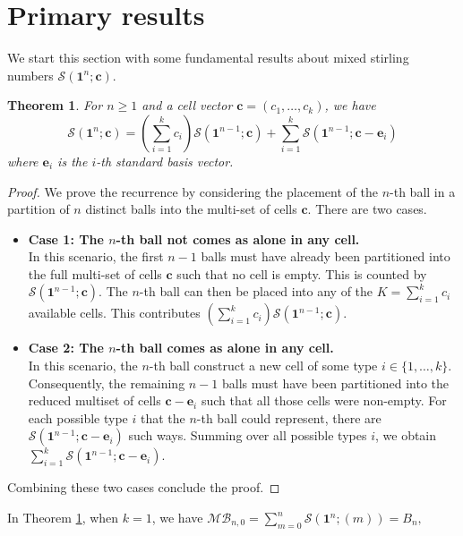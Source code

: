 \documentclass[12pt]{amsart}
\newtheorem{theorem}{Theorem}[section]
\theoremstyle{definition}
\newcommand{\vn}{\mathbf{1}^n}
\begin{document}
\section{Primary results}
We start this section with some fundamental results about mixed stirling numbers $\mathcal{S}(\vn; \mathbf{c})$. 
\begin{theorem}\label{Fun}
For $n \ge 1$ and a cell vector $\mathbf{c} = (c_1, \dots, c_k)$, we have
\begin{equation}
    \mathcal{S}(\vn; \mathbf{c})=\left( \sum_{i=1}^k c_i \right) \mathcal{S}(\mathbf{1}^{n-1}; \mathbf{c}) + \sum_{i=1}^k \mathcal{S}(\mathbf{1}^{n-1}; \mathbf{c} - \mathbf{e}_i)
\end{equation}
where $\mathbf{e}_i$ is the $i$-th standard basis vector.
\end{theorem}
\begin{proof}
We prove the recurrence by considering the placement of the $n$-th ball in a partition of $n$ distinct balls into the multi-set of cells $\mathbf{c}$. There are two cases.
\begin{itemize}
    \item \textbf{Case 1: The $n$-th ball not comes as alone in any cell.} \\
    In this scenario, the first $n-1$ balls must have already been partitioned into the full multi-set of cells $\mathbf{c}$ such that no cell is empty. This is counted by $\mathcal{S}(\mathbf{1}^{n-1}; \mathbf{c})$. The $n$-th ball can then be placed into any of the $K = \sum_{i=1}^k c_i$ available cells. This contributes
$ \left( \sum_{i=1}^k c_i \right) \mathcal{S}(\mathbf{1}^{n-1}; \mathbf{c}).$ 
   \item \textbf{Case 2: The $n$-th ball comes as alone in any cell.} \\
    In this scenario, the $n$-th ball construct a new cell of some type $i \in \{1, \dots, k\}$. Consequently, the remaining $n-1$ balls must have been partitioned into the reduced multiset of cells $\mathbf{c} - \mathbf{e}_i$ such that all those cells were non-empty. For each possible type $i$ that the $n$-th ball could represent, there are $\mathcal{S}(\mathbf{1}^{n-1}; \mathbf{c} - \mathbf{e}_i)$ such ways. Summing over all possible types $i$, we obtain $\sum_{i=1}^k \mathcal{S}(\mathbf{1}^{n-1}; \mathbf{c} - \mathbf{e}_i).$
    \end{itemize}
Combining these two cases conclude the proof.
\end{proof}
In Theorem \ref{Fun}, when $k=1$, we have
 $\mathcal{MB}_{n,0} = \sum_{m=0}^n \mathcal{S}(\mathbf{1}^n;(m)) = B_n,$
\end{document}
